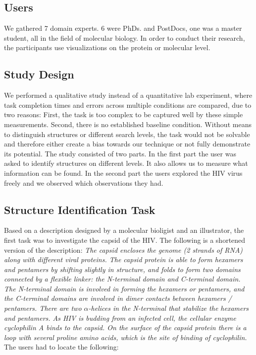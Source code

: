 \documentclass[review,journal]{vgtc}         %
\begin{document}

\subsection{Users}
We gathered 7 domain experts. 6 were PhDs. and PostDocs, one was a master student, all in the field of molecular biology. 
In order to conduct their research, the participants use visualizations on the protein or molecular level.


\subsection{Study Design}
We performed a qualitative study instead of a quantitative lab experiment, where task completion times and errors across multiple conditions are compared, due to two reasons: First, the task is too complex to be captured well by these simple measurements. 
Second, there is no established baseline condition.
Without means to distinguish structures or different search levels, the task would not be solvable and therefore either create a bias towards our technique or not fully demonstrate its potential.
The study consisted of two parts. In the first part the user was asked to identify structures on different levels. 
It also allows us to measure what information can be found.  
In the second part the users explored the HIV virus freely and we observed which observations they had.



\subsection{Structure Identification Task}
Based on a description designed by a molecular bioligist and an illustrator, the first task was to investigate the capsid of the HIV. 
The following is a shortened version of the description:
\textit{
The capsid encloses the genome (2 strands of RNA) along with different viral proteins. 
The capsid protein is able to form hexamers and pentamers by shifting slightly in structure, and folds to form two domains connected by a flexible linker: the N-terminal domain and C-terminal domain. 
The N-terminal domain is involved in forming the hexamers or pentamers, and the C-terminal domains are involved in dimer contacts between hexamers / pentamers. 
There are two $\alpha$-helices in the N-terminal that stabilize the hexamers and pentamers. 
As HIV is budding from an infected cell, the cellular enzyme cyclophilin A binds to the capsid. 
On the surface of the capsid protein there is a loop with several proline amino acids, which is the site of binding of cyclophilin.}
The users had to locate the following:
\end{document}
